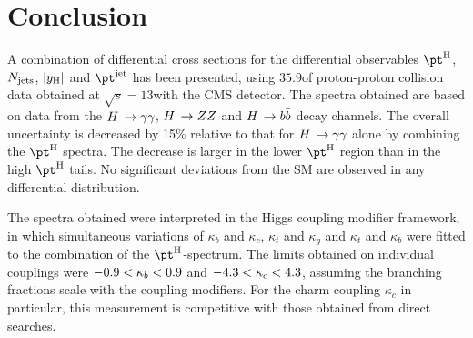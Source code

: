 \section{Conclusion}

A combination of differential cross sections for the differential observables $\pth$, $N_\text{jets}$, $\left|y_\text{H}\right|$ and $\ptjet$ has been presented, using $35.9$\ifb of proton-proton collision data obtained at $\sqrt{s}=13$\TeV with the CMS detector.
% 
The spectra obtained are based on data from the $H\,\to\gamma\gamma$, $H\,\to ZZ$ and $H\,\to b\bar{b}$ decay channels.
% 
The overall uncertainty is decreased by 15\% relative to that for $H\,\to\gamma\gamma$ alone by combining the $\pth$ spectra.
% 
The decrease is larger in the lower $\pth$ region than in the high $\pth$ tails.
% 
% 
No significant deviations from the SM are observed in any differential distribution.

The spectra obtained were interpreted in the Higgs coupling modifier framework, in which simultaneous variations of $\kappa_b$ and $\kappa_c$, $\kappa_t$ and $\kappa_g$ and $\kappa_t$ and $\kappa_b$ were fitted to the combination of the $\pth$-spectrum.
% 
The limits obtained on individual couplings were $-0.9 < \kappa_b < 0.9$ and $-4.3 < \kappa_c < 4.3$, assuming the branching fractions scale with the coupling modifiers.
% 
For the charm coupling $\kappa_c$ in particular, this measurement is competitive with those obtained from direct searches.
